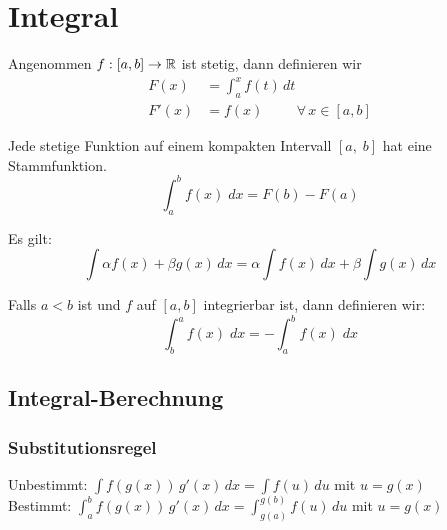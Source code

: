 \section{Integral}
\begin{theorem} Angenommen $f:[a, b] \to \mathbb{R}$ ist stetig, dann definieren wir
\begin{align*}
	F(x) &= \int_a^x f(t) \, dt \\
	F'(x) &= f(x) \hspace{1cm} \forall \, x \in [a, b]
\end{align*}
\end{theorem}

\begin{corollary}[Stammfunktion] Jede stetige Funktion auf einem kompakten Intervall $[a,\; b]$ hat eine Stammfunktion.
\[
	\int_a^b f(x) \; dx = F(b) - F(a)
\]
\end{corollary}

\begin{corollary}[Linearität] Es gilt:
\[
	\int \alpha f(x) + \beta g(x)\,dx = \alpha \int f(x)\,dx + \beta \int g(x)\,dx
\]
\end{corollary}

\begin{definition}Falls $a < b$ ist und $f$ auf $[a, b]$ integrierbar ist, dann definieren wir:
\[
	\int_b^a f(x) \; dx = - \int_a^b f(x) \; dx
\]
\end{definition}
\newpage
\subsection{Integral-Berechnung}
\subsubsection{Substitutionsregel}
Unbestimmt: $\int f(g(x)) \, g'(x) \, dx = \int f(u) \, du$ mit $u = g(x)$\\
Bestimmt: $\int_a^b f(g(x)) \, g'(x) \, dx = \int_{g(a)}^{g(b)} f(u) \, du$ mit $u = g(x)$

